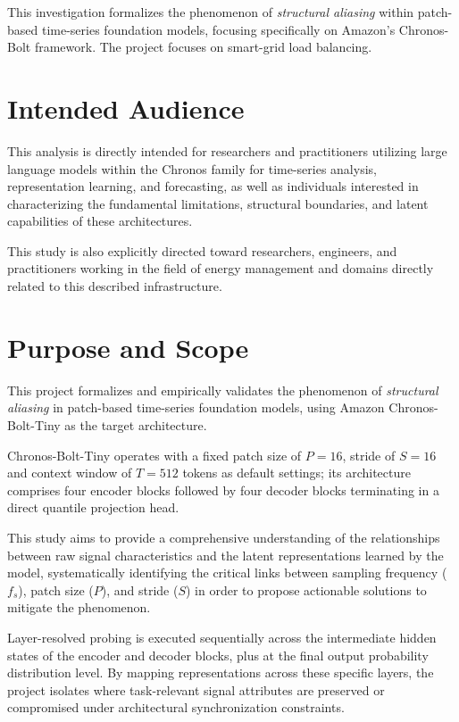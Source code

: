 This investigation formalizes the phenomenon of \textit{structural aliasing} within patch-based time-series foundation models, focusing specifically on Amazon's Chronos-Bolt framework. \cite{ansariChronosLearningLanguage2024, FastAccurateZeroshot2024a} The project focuses on smart-grid load balancing. 

\section{Intended Audience}
This analysis is directly intended for researchers and practitioners utilizing large language models within the Chronos family for time-series analysis, representation learning, and forecasting, as well as individuals interested in characterizing the fundamental limitations, structural boundaries, and latent capabilities of these architectures. 

This study is also explicitly directed toward researchers, engineers, and practitioners working in the field of energy management and domains directly related to this described infrastructure. 

\section{Purpose and Scope}
This project formalizes and empirically validates the phenomenon of \textit{structural aliasing} in patch-based time-series foundation models, using Amazon Chronos-Bolt-Tiny as the target architecture.

Chronos-Bolt-Tiny operates with a fixed patch size of $P=16$, stride of $S=16$ and context window of $T=512$ tokens as default settings; its architecture comprises four encoder blocks followed by four decoder blocks terminating in a direct quantile projection head. \cite{ChronosBoltPipelineAmazonscienceChronosforecastinga}

This study aims to provide a comprehensive understanding of the relationships between raw signal characteristics and the latent representations learned by the model, systematically identifying the critical links between sampling frequency ($f_s$), patch size ($P$), and stride ($S$) in order to propose actionable solutions to mitigate the phenomenon.

Layer-resolved probing is executed sequentially across the intermediate hidden states of the encoder and decoder blocks, plus at the final output probability distribution level. By mapping representations across these specific layers, the project isolates where task-relevant signal attributes are preserved or compromised under architectural synchronization constraints.


